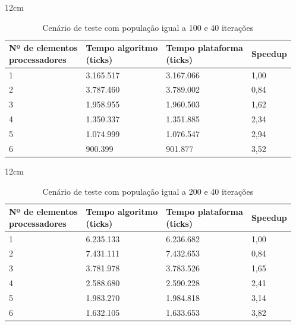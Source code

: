 
\begin{table}[h]{12cm}
    \caption{Cenário de teste com população igual a 100 e 40 iterações}
    \label{tbl:taylor-vortex-parameters}
    \begin{tabular}{llll}
        \hline
        \shortstack[l]{Nº de elementos \\ processadores} & \shortstack[l]{Tempo algoritmo \\ (ticks)} & \shortstack[l]{Tempo plataforma \\ (ticks)} & Speedup \\
        \hline
        1 & 3.165.517 & 3.167.066 & 1,00 \\
        2 & 3.787.460 & 3.789.002 & 0,84 \\
        3 & 1.958.955 & 1.960.503 &	1,62 \\
        4 & 1.350.337 & 1.351.885 & 2,34 \\
        5 & 1.074.999 & 1.076.547 & 2,94 \\
        6 & 900.399   & 901.877   & 3,52 \\
        \hline
    \end{tabular}
\end{table}

\begin{table}[h]{12cm}
    \caption{Cenário de teste com população igual a 200 e 40 iterações}
    \label{tbl:taylor-vortex-parameters}
    \begin{tabular}{llll}
        \hline
        \shortstack[l]{Nº de elementos \\ processadores} & \shortstack[l]{Tempo algoritmo \\ (ticks)} & \shortstack[l]{Tempo plataforma \\ (ticks)} & Speedup \\
        \hline
        1 & 6.235.133 & 6.236.682 & 1,00 \\
        2 & 7.431.111 & 7.432.653 & 0,84 \\
        3 & 3.781.978 & 3.783.526 &	1,65 \\
        4 & 2.588.680 & 2.590.228 & 2,41 \\
        5 & 1.983.270 & 1.984.818 & 3,14 \\
        6 & 1.632.105 & 1.633.653 & 3,82 \\
        \hline
    \end{tabular}
\end{table}

